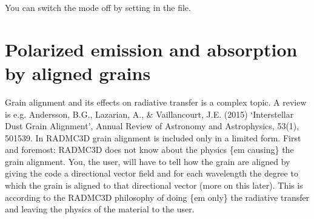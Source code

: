 \documentclass[letterpaper,10pt,english]{sphinxmanual}
\begin{document}
 You can switch the mode off by setting  in the
 file.


\section{Polarized emission and absorption by aligned grains}
\label{\detokenize{dustradtrans:polarized-emission-and-absorption-by-aligned-grains}}\label{\detokenize{dustradtrans:sec-polarized-thermal-emission}}

Grain alignment and its effects on radiative transfer is a complex topic. A
review is e.g. Andersson, B.G., Lazarian, A., \& Vaillancourt, J.E. (2015)
‘Interstellar Dust Grain Alignment’, Annual Review of Astronomy and
Astrophysics, 53(1), 501\textendash{}539. In RADMC\sphinxhyphen{}3D grain alignment is included only in a
limited form. First and foremost: RADMC\sphinxhyphen{}3D does not know about the physics \{em
causing\} the grain alignment. You, the user, will have to tell how the grain are
aligned by giving the code a directional vector field and for each wavelength
the degree to which the grain is aligned to that directional vector (more on
this later). This is according to the RADMC\sphinxhyphen{}3D philosophy of doing \{em only\}
the radiative transfer and leaving the physics of the material to the user.
\end{document}
